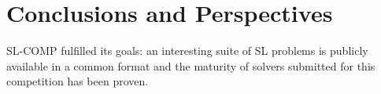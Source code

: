 \documentclass[twoside,11pt]{article}
\begin{document}
%
%



\section{Conclusions and Perspectives}

SL-COMP fulfilled its goals:
an interesting suite of SL problems is publicly available in a common format and
the maturity of solvers submitted for this competition has been proven.
\end{document}

